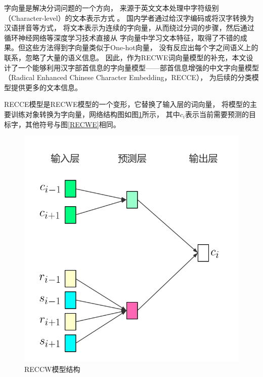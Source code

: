 字向量是解决分词问题的一个方向，
来源于英文文本处理中字符级别（Character-level）的文本表示方式
。
国内学者通过给汉字编码或将汉字转换为汉语拼音等方式，
将文本表示为连续的字向量，从而绕过分词的步骤，然后通过循环神经网络等深度学习技术直接从
字向量中学习文本特征，取得了不错的成果。但这些方法得到字向量类似于One-hot向量，
没有反应出每个字之间语义上的联系，忽略了大量的语义信息。
因此，作为RECWE词向量模型的补充，本文设计了一个能够利用汉字部首信息的字向量模型——部首信息增强的中文字向量模型（Radical Enhanced Chinese Character Embedding，RECCE），
为后续的分类模型提供更多的文本信息。

RECCE模型是RECWE模型的一个变形，它替换了输入层的词向量，
将模型的主要训练对象转换为字向量，网络结构图如图\ref{RECCE}所示，
其中$c_i$表示当前需要预测的目标字，其他符号与图\ref{RECWE}相同。
\begin{figure}
    \includegraphics[scale=0.4]{picture/RECCE.png}
    \caption{RECCW模型结构}
    \label{RECCE}
\end{figure}

